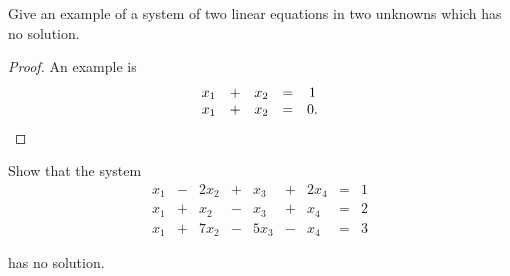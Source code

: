 \begin{exercise}
    Give an example of a system of two linear equations in two unknowns which has no solution.
\end{exercise}

\begin{proof}
    An example is
    \[
        \begin{array}{ccccc}
            x_{1} & + & x_{2} & = & 1  \\
            x_{1} & + & x_{2} & = & 0.
        \end{array}\qedhere
    \]
\end{proof}

\begin{exercise}
    Show that the system
    \[
        \begin{array}{cccccccccc}
            x_{1} & - & 2{x}_{2} & + & x_{3}    & + & 2{x}_{4} & = & 1 \\
            x_{1} & + & x_{2}    & - & x_{3}    & + & x_{4}    & = & 2 \\
            x_{1} & + & 7{x}_{2} & - & 5{x}_{3} & - & x_{4}    & = & 3
        \end{array}
    \]

    has no solution.
\end{exercise}

